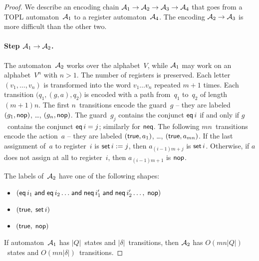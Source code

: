 \documentclass{article} %
\theoremstyle{definition}
\theoremstyle{remark}
\begin{document}
\begin{proof}
We describe an encoding chain ${\cal A}_1\to{\cal A}_2\to{\cal A}_3\to{\cal A}_4$ that goes from a TOPL automaton~${\cal A}_1$ to a register automaton~${\cal A}_4$.
The encoding ${\cal A}_2\to{\cal A}_3$ is more difficult than the other two.

\paragraph{Step ${\cal A}_1\to{\cal A}_2$.}
The automaton~${\cal A}_2$ works over the alphabet~$V$, while ${\cal A}_1$ may work on an alphabet~$V^n$ with $n>1$.
The number of registers is preserved.
Each letter $(v_1,\ldots,v_n)$ is transformed into the word $v_1\ldots v_n$ repeated $m+1$ times.
Each transition $\bigl(q_1,(g,a),q_2\bigr)$ is encoded with a path from~$q_1$ to~$q_2$ of length $(m+1)n$.
The first $n$~transitions encode the guard~$g$ -- they are labeled $(g_1,{\sf nop})$, \dots, $(g_n,{\sf nop})$.
The guard~$g_j$ contains the conjunct ${\sf eq}\,i$ if and only if $g$~contains the conjunct ${\sf eq}\,i=j$; similarly for ${\sf neq}$.
The following $mn$~transitions encode the action~$a$ -- they are labeled $({\sf true}, a_1)$, \dots, $({\sf true}, a_{mn})$.
If the last assignment of~$a$ to register~$i$ is ${\sf set}\,i:=j$, then $a_{(i-1)m+j}$ is ${\sf set}\,i$.
Otherwise, if $a$ does not assign at all to register~$i$, then $a_{(i-1)m+1}$ is ${\sf nop}$.

The labels of~${\cal A}_2$ have one of the following shapes:
\begin{itemize}
\item $({\sf eq}\,i_1\mathrel{\sf and}{\sf eq}\,i_2\ldots
  \mathrel{\sf and}{\sf neq}\,i'_1\mathrel{\sf and}{\sf neq}\,i'_2\ldots,\;
  {\sf nop})$
\item $({\sf true},\;{\sf set}\,i)$
\item $({\sf true},\;{\sf nop})$
\end{itemize}
If automaton~${\cal A}_1$ has $|Q|$~states and $|\delta|$~transitions, then ${\cal A}_2$ has $O(mn|Q|)$~states and $O(mn|\delta|)$~transitions.


\end{proof}
\end{document}
